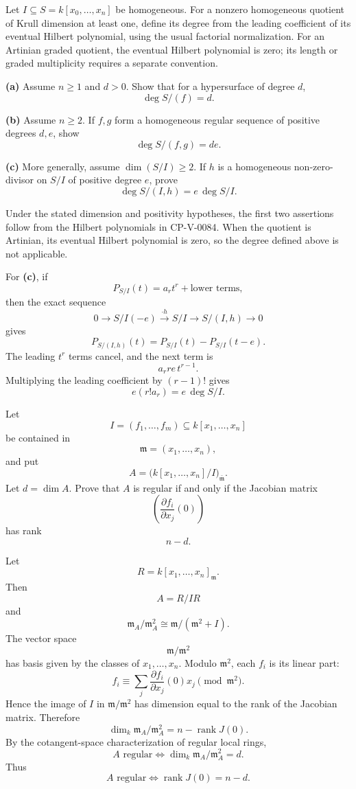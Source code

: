 \begin{problem}[CP-V-0085]
\label{prob:cp-v-0085}
Let \(I\subseteq S=k[x_0,\dots,x_n]\) be homogeneous. For a
nonzero homogeneous quotient of Krull dimension at least one, define
its degree from the leading coefficient of its eventual Hilbert
polynomial, using the usual factorial normalization. For an Artinian
graded quotient, the eventual Hilbert polynomial is zero; its length
or graded multiplicity requires a separate convention.

\textbf{(a)} Assume \(n\ge1\) and \(d>0\). Show that for a hypersurface of degree \(d\),
\[
\deg S/(f)=d.
\]

\textbf{(b)} Assume \(n\ge2\). If \(f,g\) form a homogeneous regular sequence of positive degrees
\(d,e\), show
\[
\deg S/(f,g)=de.
\]

\textbf{(c)} More generally, assume \(\dim(S/I)\ge2\). If \(h\) is a
homogeneous non-zero-divisor on \(S/I\) of positive degree \(e\), prove
\[
\deg S/(I,h)=e\,\deg S/I.
\]
\end{problem}

\begin{solution}
Under the stated dimension and positivity hypotheses, the first
two assertions follow from the Hilbert polynomials in CP-V-0084.
When the quotient is Artinian, its eventual Hilbert polynomial is zero,
so the degree defined above is not applicable.

For \textbf{(c)}, if
\[
P_{S/I}(t)=a_rt^r+\text{lower terms},
\]
then the exact sequence
\[
0\to S/I(-e)\xrightarrow{\cdot h}S/I
\to S/(I,h)\to0
\]
gives
\[
P_{S/(I,h)}(t)=P_{S/I}(t)-P_{S/I}(t-e).
\]
The leading \(t^r\) terms cancel, and the next term is
\[
a_rre\,t^{r-1}.
\]
Multiplying the leading coefficient by \((r-1)!\) gives
\[
e(r!a_r)=e\,\deg S/I.
\]
\end{solution}


\begin{problem}[CP-V-0086]
\label{prob:cp-v-0086}
Let
\[
I=(f_1,\dots,f_m)\subseteq k[x_1,\dots,x_n]
\]
be contained in
\[
\mathfrak m=(x_1,\dots,x_n),
\]
and put
\[
A=\bigl(k[x_1,\dots,x_n]/I\bigr)_{\bar{\mathfrak m}}.
\]
Let \(d=\dim A\). Prove that \(A\) is regular if and only if the Jacobian
matrix
\[
\left(
\frac{\partial f_i}{\partial x_j}(0)
\right)
\]
has rank
\[
n-d.
\]
\end{problem}

\begin{solution}
Let
\[
R=k[x_1,\dots,x_n]_{\mathfrak m}.
\]
Then
\[
A=R/IR
\]
and
\[
\mathfrak m_A/\mathfrak m_A^2
\cong
\mathfrak m/(\mathfrak m^2+I).
\]
The vector space
\[
\mathfrak m/\mathfrak m^2
\]
has basis given by the classes of \(x_1,\dots,x_n\). Modulo
\(\mathfrak m^2\), each \(f_i\) is its linear part:
\[
f_i\equiv
\sum_j
\frac{\partial f_i}{\partial x_j}(0)x_j
\pmod{\mathfrak m^2}.
\]
Hence the image of \(I\) in \(\mathfrak m/\mathfrak m^2\) has dimension
equal to the rank of the Jacobian matrix. Therefore
\[
\dim_k\mathfrak m_A/\mathfrak m_A^2
=
n-\operatorname{rank}J(0).
\]
By the cotangent-space characterization of regular local rings,
\[
A\text{ regular}
\iff
\dim_k\mathfrak m_A/\mathfrak m_A^2=d.
\]
Thus
\[
A\text{ regular}
\iff
\operatorname{rank}J(0)=n-d.
\]
\end{solution}




